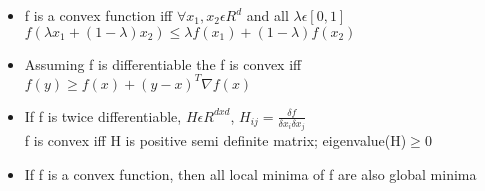 \documentclass[a4paper]{article}
\begin{document}
\begin{enumerate}
\begin{itemize}
        \item f is a convex function iff $\forall x_1,x_2\epsilon R^d$ and all $\lambda \epsilon [0,1]$\\
        $f(\lambda x_1 + (1-\lambda)x_2)\leq \lambda f(x_1) + (1-\lambda)f(x_2)$
        \item Assuming f is differentiable the f is convex iff\\
        $f(y)\geq f(x) + (y - x)^T\nabla f(x)$
        \item If f is twice differentiable, $H\epsilon R^{dxd}$, $H_{ij} = \frac{\delta f}{\delta x_i\delta x_j}$\\
        f is convex iff H is positive semi definite matrix; eigenvalue(H)$\geq 0$
        \item If f is a convex function, then all local minima of f are also global minima
    \end{itemize}
 \end{enumerate}
\end{document}
